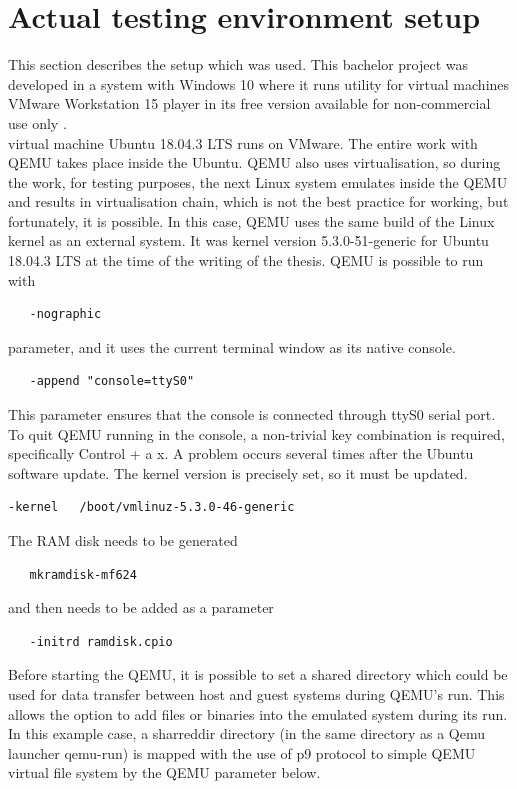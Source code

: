 \documentclass{ctuthesis}
\begin{document}
 \section{Actual testing environment setup}
  This section describes the setup which was used. This bachelor project was developed in a system with Windows 10 where it runs utility for virtual machines VMware Workstation 15 player in its free version available for non-commercial use only \cite{vmware}. \\
  virtual machine Ubuntu 18.04.3 LTS \cite{ubuntu} runs on VMware. The entire work with QEMU takes place inside the Ubuntu. QEMU also uses virtualisation, so during the work, for testing purposes, the next Linux system emulates inside the QEMU and results in virtualisation chain, which is not the best practice for working, but fortunately, it is possible. In this case, QEMU uses the same build of the Linux kernel as an external system. It was kernel version 5.3.0-51-generic for Ubuntu 18.04.3 LTS at the time of the writing of the thesis. QEMU is possible to run with
  \begin{verbatim}   -nographic\end{verbatim}
   parameter, and it uses the current terminal window as its native console.
   \begin{verbatim}   -append "console=ttyS0"\end{verbatim}
This parameter ensures that the console is connected through ttyS0 serial port. To quit QEMU running in the console, a  non-trivial key combination is required, specifically Control + a  x. A problem occurs several times after the Ubuntu software update. The kernel version is precisely set, so it must be updated.
  \begin{verbatim}-kernel   /boot/vmlinuz-5.3.0-46-generic\end{verbatim}
  The RAM disk needs to be generated
  \begin{verbatim}   mkramdisk-mf624\end{verbatim}
  and then needs to be added as a parameter 
  \begin{verbatim}   -initrd ramdisk.cpio\end{verbatim}
  Before starting the QEMU, it is possible to set a shared directory which could be used for data transfer between host and guest systems during QEMU's run. This allows the option to add files or binaries into the emulated system during its run. In this example case, a sharreddir directory (in the same directory as a Qemu launcher qemu-run) is mapped with the use of p9 protocol to simple QEMU virtual file system by the QEMU parameter below.
\end{document}
